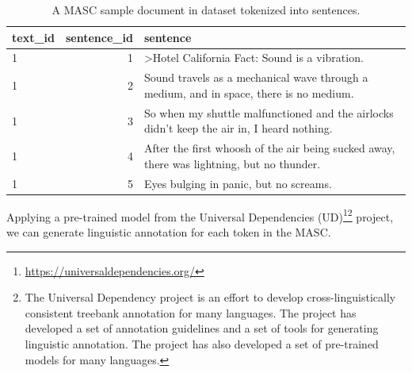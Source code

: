 \documentclass[
  letterpaper,
  DIV=11,
  numbers=noendperiod]{scrreport}
\theoremstyle{definition}
\theoremstyle{remark}
\DeclareRobustCommand{\href}[2]{#2\footnote{\url{#1}}}
\begin{document}
\hypertarget{tbl-ud-masc-plain-dataset}{}
\begin{table}
\caption{\label{tbl-ud-masc-plain-dataset}A MASC sample document in dataset tokenized into sentences. }\tabularnewline

\centering
\begin{tabular}{lrl}
\toprule
text\_id & sentence\_id & sentence\\
\midrule
1 & 1 & >Hotel California Fact: Sound is a vibration.\\
1 & 2 & Sound travels as a mechanical wave through a medium, and in space, there is no medium.\\
1 & 3 & So when my shuttle malfunctioned and the airlocks didn't keep the air in, I heard nothing.\\
1 & 4 & After the first whoosh of the air being sucked away, there was lightning, but no thunder.\\
1 & 5 & Eyes bulging in panic, but no screams.\\
\bottomrule
\end{tabular}
\end{table}

Applying a pre-trained model from the
\href{https://universaldependencies.org/}{Universal Dependencies
(UD)}\footnote{The Universal Dependency project is an effort to develop
  cross-linguistically consistent treebank annotation for many
  languages. The project has developed a set of annotation guidelines
  and a set of tools for generating linguistic annotation. The project
  has also developed a set of pre-trained models for many languages.}
project, we can generate linguistic annotation for each token in the
MASC.
\end{document}
